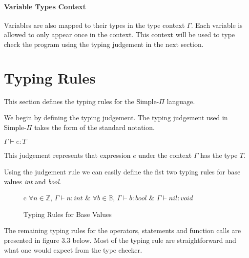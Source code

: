 \documentclass[a4paper,12pt]{report}
\begin{document}
\paragraph{Variable Types Context} Variables are also mapped to their types 
in the type context $\Gamma$. Each variable is allowed to only appear once in 
the context. This context will be used to type check the program using the 
typing judgement in the next section.

\section{Typing Rules}
This section defines the typing rules for the Simple-$\Pi$ language.

\par
We begin by defining the typing judgement. The typing judgement used in 
Simple-$\Pi$ takes the form of the standard notation. 
\begin{center}
  $\Gamma \vdash e : T$
\end{center}
This judgement represents that expression $e$ under the context $\Gamma$ has the 
type $T$.

\par
Using the judgement rule we can easily define the fist two typing rules for base 
values \textit{int} and \textit{bool}.

\begin{figure}[H]
  \begin{center}
    \begin{tabular} {c}
      $\forall n \in \mathbb{Z}$, $\Gamma \vdash n : int$ & 
      $\forall b \in \mathbb{B}$, $\Gamma \vdash b : bool$ & 
      $\Gamma \vdash nil : void$      
    \end{tabular}
  \end{center}
  \caption{Typing Rules for Base Values}
\end{figure}

\par
The remaining typing rules for the operators, statements and function 
calls are presented in figure 3.3 below. Most of the typing rule are straightforward and what one would expect from the 
type checker. 
\end{document}
